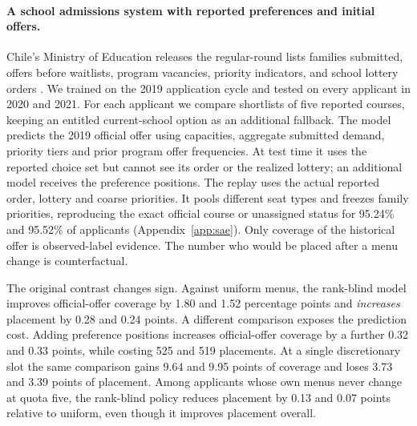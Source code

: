\paragraph{A school admissions system with reported preferences and initial offers.}
Chile's Ministry of Education releases the regular-round lists families submitted, offers before waitlists, program vacancies, priority indicators, and school lottery orders \citep{saedata,correaschool}. We trained on the 2019 application cycle and tested on every applicant in 2020 and 2021. For each applicant we compare shortlists of five reported courses, keeping an entitled current-school option as an additional fallback. The model predicts the 2019 official offer using capacities, aggregate submitted demand, priority tiers and prior program offer frequencies. At test time it uses the reported choice set but cannot see its order or the realized lottery; an additional model receives the preference positions. The replay uses the actual reported order, lottery and coarse priorities. It pools different seat types and freezes family priorities, reproducing the exact official course or unassigned status for 95.24\% and 95.52\% of applicants (Appendix~\ref{app:sae}). Only coverage of the historical offer is observed-label evidence. The number who would be placed after a menu change is counterfactual.

The original contrast changes sign. Against uniform menus, the rank-blind model improves official-offer coverage by 1.80 and 1.52 percentage points and \emph{increases} placement by 0.28 and 0.24 points. A different comparison exposes the prediction cost. Adding preference positions increases official-offer coverage by a further 0.32 and 0.33 points, while costing 525 and 519 placements. At a single discretionary slot the same comparison gains 9.64 and 9.95 points of coverage and loses 3.73 and 3.39 points of placement. Among applicants whose own menus never change at quota five, the rank-blind policy reduces placement by 0.13 and 0.07 points relative to uniform, even though it improves placement overall.
